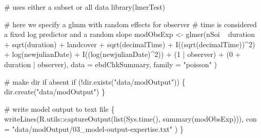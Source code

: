 \documentclass[
]{article}
\newenvironment{Shaded}{}{}
\newcommand{\CommentTok}[1]{\textcolor[rgb]{0.00,0.50,0.00}{#1}}
\newcommand{\ControlFlowTok}[1]{\textcolor[rgb]{0.00,0.00,1.00}{#1}}
\newcommand{\DataTypeTok}[1]{#1}
\newcommand{\DecValTok}[1]{#1}
\newcommand{\KeywordTok}[1]{\textcolor[rgb]{0.00,0.00,1.00}{#1}}
\newcommand{\NormalTok}[1]{#1}
\newcommand{\OperatorTok}[1]{#1}
\newcommand{\StringTok}[1]{\textcolor[rgb]{0.00,0.50,0.50}{#1}}
\begin{document}
\begin{Shaded}
\begin{Highlighting}[]
\CommentTok{# uses either a subset or all data}
\KeywordTok{library}\NormalTok{(lmerTest)}

\CommentTok{# here we specify a glmm with random effects for observer}
\CommentTok{# time is considered a fixed log predictor and a random slope}
\NormalTok{modObsExp <-}\StringTok{ }\KeywordTok{glmer}\NormalTok{(nSoi }\OperatorTok{~}\StringTok{ }\NormalTok{duration }\OperatorTok{+}\StringTok{ }\KeywordTok{sqrt}\NormalTok{(duration) }\OperatorTok{+}
\StringTok{  }\NormalTok{landcover }\OperatorTok{+}
\StringTok{  }\KeywordTok{sqrt}\NormalTok{(decimalTime) }\OperatorTok{+}
\StringTok{  }\KeywordTok{I}\NormalTok{((}\KeywordTok{sqrt}\NormalTok{(decimalTime))}\OperatorTok{^}\DecValTok{2}\NormalTok{) }\OperatorTok{+}
\StringTok{  }\KeywordTok{log}\NormalTok{(newjulianDate) }\OperatorTok{+}
\StringTok{  }\KeywordTok{I}\NormalTok{((}\KeywordTok{log}\NormalTok{(newjulianDate)}\OperatorTok{^}\DecValTok{2}\NormalTok{)) }\OperatorTok{+}
\StringTok{  }\NormalTok{(}\DecValTok{1} \OperatorTok{|}\StringTok{ }\NormalTok{observer) }\OperatorTok{+}\StringTok{ }\NormalTok{(}\DecValTok{0} \OperatorTok{+}\StringTok{ }\NormalTok{duration }\OperatorTok{|}\StringTok{ }\NormalTok{observer),}
\DataTypeTok{data =}\NormalTok{ ebdChkSummary, }\DataTypeTok{family =} \StringTok{"poisson"}
\NormalTok{)}
\end{Highlighting}
\end{Shaded}

\begin{Shaded}
\begin{Highlighting}[]
\CommentTok{# make dir if absent}
\ControlFlowTok{if}\NormalTok{ (}\OperatorTok{!}\KeywordTok{dir.exists}\NormalTok{(}\StringTok{"data/modOutput"}\NormalTok{)) \{}
  \KeywordTok{dir.create}\NormalTok{(}\StringTok{"data/modOutput"}\NormalTok{)}
\NormalTok{\}}

\CommentTok{# write model output to text file}
\NormalTok{\{}
  \KeywordTok{writeLines}\NormalTok{(R.utils}\OperatorTok{::}\KeywordTok{captureOutput}\NormalTok{(}\KeywordTok{list}\NormalTok{(}\KeywordTok{Sys.time}\NormalTok{(), }\KeywordTok{summary}\NormalTok{(modObsExp))),}
    \DataTypeTok{con =} \StringTok{"data/modOutput/03_model-output-expertise.txt"}
\NormalTok{  )}
\NormalTok{\}}
\end{Highlighting}
\end{Shaded}
\end{document}
